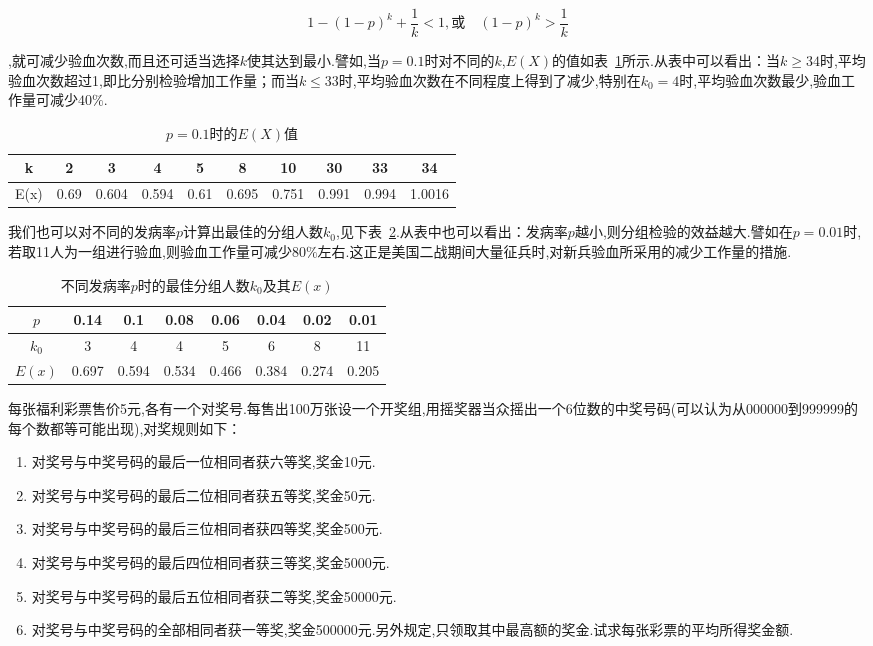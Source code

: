 \[
1-(1-p)^{k}+\frac{1}{k}<1, \text{或} \quad(1-p)^{k}>\frac{1}{k}
\]

,就可减少验血次数,而且还可适当选择$ k $使其达到最小.譬如,当$ p=0.1 $时对不同的$ k $,$ E(X) $的值如表~\ref{tab:2.21}所示.从表中可以看出：当$k \geqslant 34$时,平均验血次数超过1,即比分别检验增加工作量；而当$k \leqslant 33$时,平均验血次数在不同程度上得到了减少,特别在$k_{0}=4$时,平均验血次数最少,验血工作量可减少$ 40\% $.

\begin{table}[htbp]
	\centering
	\caption{$ p=0.1 $时的$ E(X) $值}
	\begin{tabular}{c|ccccccccc}
		\toprule
		k     & 2     & 3     & 4     & 5     & 8     & 10    & 30    & 33    & 34 \\\midrule
		E(x)  & 0.69  & 0.604 & 0.594 & 0.61  & 0.695 & 0.751 & 0.991 & 0.994 & 1.0016 \\\bottomrule
	\end{tabular}%
	\label{tab:2.21}%
\end{table}%


我们也可以对不同的发病率$ p $计算出最佳的分组人数$ k_0 $,见下表~\ref{tab:2.2.2}.从表中也可以看出：发病率$ p $越小,则分组检验的效益越大.譬如在$ p=0.01 $时,若取11人为一组进行验血,则验血工作量可减少$ 80\% $左右.这正是美国二战期间大量征兵时,对新兵验血所采用的减少工作量的措施.

\begin{table}[htbp]
	\centering
	\caption{不同发病率$ p $时的最佳分组人数$ k_0 $及其$ E(x) $}
	\begin{tabular}{c|ccccccc}
		\toprule
		$ p $     & 0.14  & 0.1   & 0.08  & 0.06  & 0.04  & 0.02  & 0.01 \\\midrule
		$ k_0 $    & 3     & 4     & 4     & 5     & 6     & 8     & 11 \\\midrule
		$ E(x) $  & 0.697 & 0.594 & 0.534 & 0.466 & 0.384 & 0.274 & 0.205 \\\bottomrule
	\end{tabular}%
	\label{tab:2.2.2}%
\end{table}%

\begin{example}
	每张福利彩票售价5元,各有一个对奖号.每售出100万张设一个开奖组,用摇奖器当众摇出一个6位数的中奖号码(可以认为从000000到999999的每个数都等可能出现),对奖规则如下：
	\begin{enumerate}
		\item 对奖号与中奖号码的最后一位相同者获六等奖,奖金10元.
		\item 对奖号与中奖号码的最后二位相同者获五等奖,奖金50元.
		\item 对奖号与中奖号码的最后三位相同者获四等奖,奖金500元.
		\item 对奖号与中奖号码的最后四位相同者获三等奖,奖金5000元.
		\item 对奖号与中奖号码的最后五位相同者获二等奖,奖金50000元.
		\item 对奖号与中奖号码的全部相同者获一等奖,奖金500000元.另外规定,只领取其中最高额的奖金.试求每张彩票的平均所得奖金额.
	\end{enumerate}
\end{example}
	
